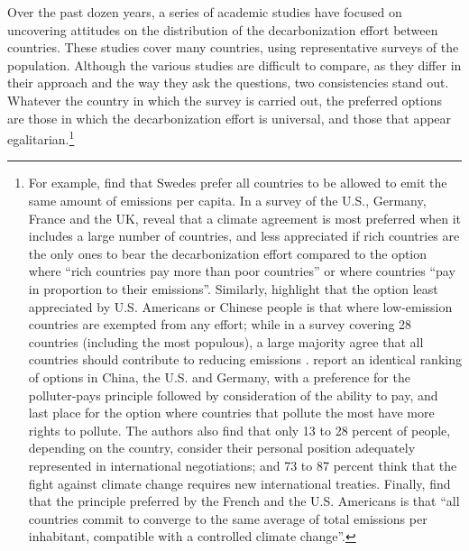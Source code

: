 \documentclass[a5paper,english,openany]{memoir}
\begin{document}
Over the past dozen years, a series of academic studies have focused on uncovering attitudes on the distribution of the decarbonization effort between countries. These studies cover many countries, using representative surveys of the population. Although %
the various studies are difficult to compare, as they differ in their approach and the way they ask the questions, two consistencies %
stand out. Whatever the country in which the survey is carried out, the preferred options are those in which the decarbonization %
effort is universal, and those that appear egalitarian.\footnote{For example, \citet{carlsson_is_2011} find that Swedes prefer all countries to be allowed to emit the same amount of emissions per capita. In a survey of the U.S., Germany, France and the UK, \citet{bechtel_mass_2013} reveal that a climate agreement is most preferred when it includes a large number of countries, %
and less appreciated if rich countries are the only ones to bear the decarbonization effort compared to the option where ``rich countries pay more than poor countries'' or where countries ``pay in proportion to their emissions''. Similarly, \citet{carlsson_fair_2013} highlight that the option least appreciated by U.S. Americans or Chinese people is that where low-emission countries are exempted from any effort; while in a survey covering 28 countries (including the most populous), a large majority agree that all countries should contribute to reducing emissions \citep{dabla-norris_public_2023}. 
\citet{schleich_citizens_2016} report an identical ranking of options in China, the U.S. and Germany, with a preference for the polluter-pays principle followed by consideration of the ability %
to pay, and last place for the option where countries that pollute the most have more rights to pollute. The authors also find that only 13 to 28 percent of people, depending on the country, %
consider their personal position adequately represented in international negotiations; and 73 to 87 percent think that the fight against climate change requires new international treaties. Finally, \citet{meilland_international_2024} find that the principle preferred by the French and the U.S. Americans is that ``all countries commit to converge to the same average of total emissions per inhabitant, compatible with a controlled climate change''.} %
\end{document}
